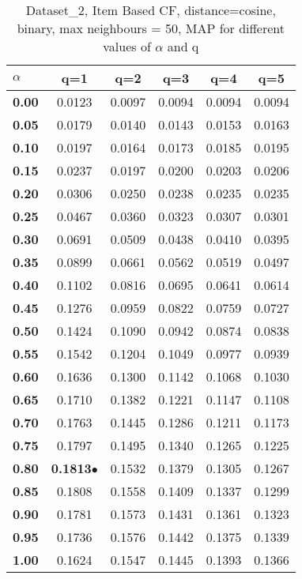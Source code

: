\begin{table}
\begin{center}
\begin{tabular}{ | l || c | c | c | c | c |}
\hline
\textbf{$\alpha$} & \textbf{q=1} & \textbf{q=2} & \textbf{q=3} & \textbf{q=4} & \textbf{q=5} \\
\hline
\textbf{0.00} & 0.0123 & 0.0097 & 0.0094 & 0.0094 & 0.0094\\
\hline
\textbf{0.05} & 0.0179 & 0.0140 & 0.0143 & 0.0153 & 0.0163\\
\hline
\textbf{0.10} & 0.0197 & 0.0164 & 0.0173 & 0.0185 & 0.0195\\
\hline
\textbf{0.15} & 0.0237 & 0.0197 & 0.0200 & 0.0203 & 0.0206\\
\hline
\textbf{0.20} & 0.0306 & 0.0250 & 0.0238 & 0.0235 & 0.0235\\
\hline
\textbf{0.25} & 0.0467 & 0.0360 & 0.0323 & 0.0307 & 0.0301\\
\hline
\textbf{0.30} & 0.0691 & 0.0509 & 0.0438 & 0.0410 & 0.0395\\
\hline
\textbf{0.35} & 0.0899 & 0.0661 & 0.0562 & 0.0519 & 0.0497\\
\hline
\textbf{0.40} & 0.1102 & 0.0816 & 0.0695 & 0.0641 & 0.0614\\
\hline
\textbf{0.45} & 0.1276 & 0.0959 & 0.0822 & 0.0759 & 0.0727\\
\hline
\textbf{0.50} & 0.1424 & 0.1090 & 0.0942 & 0.0874 & 0.0838\\
\hline
\textbf{0.55} & 0.1542 & 0.1204 & 0.1049 & 0.0977 & 0.0939\\
\hline
\textbf{0.60} & 0.1636 & 0.1300 & 0.1142 & 0.1068 & 0.1030\\
\hline
\textbf{0.65} & 0.1710 & 0.1382 & 0.1221 & 0.1147 & 0.1108\\
\hline
\textbf{0.70} & 0.1763 & 0.1445 & 0.1286 & 0.1211 & 0.1173\\
\hline
\textbf{0.75} & 0.1797 & 0.1495 & 0.1340 & 0.1265 & 0.1225\\
\hline
\textbf{0.80} & \textbf{0.1813}$\bullet$ & 0.1532 & 0.1379 & 0.1305 & 0.1267\\
\hline
\textbf{0.85} & 0.1808 & 0.1558 & 0.1409 & 0.1337 & 0.1299\\
\hline
\textbf{0.90} & 0.1781 & 0.1573 & 0.1431 & 0.1361 & 0.1323\\
\hline
\textbf{0.95} & 0.1736 & 0.1576 & 0.1442 & 0.1375 & 0.1339\\
\hline
\textbf{1.00} & 0.1624 & 0.1547 & 0.1445 & 0.1393 & 0.1366\\
\hline
\end{tabular}
\caption{Dataset\_2, Item Based CF, distance=cosine, binary, max neighbours = 50, MAP for different values of $\alpha$ and q}
\label{table:MAP_Dataset_2_icf_cosine_binary_mnn=50}
\end{center}
\end{table}
